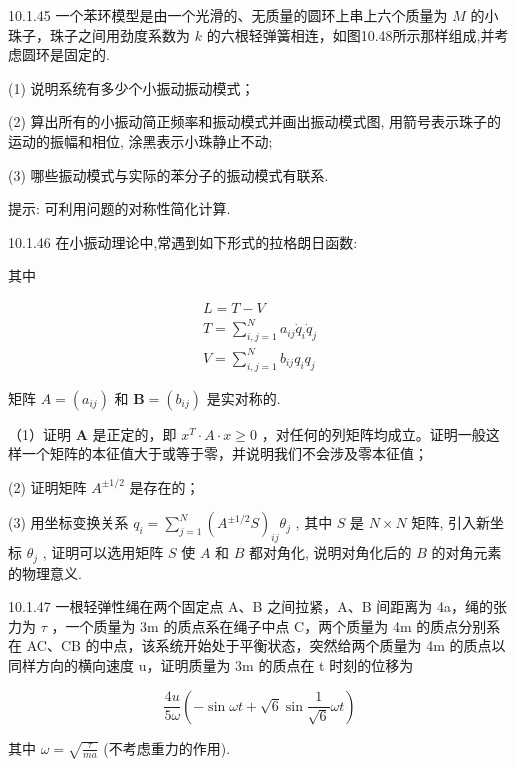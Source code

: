 \begin{problem}{10.1.45}
一个苯环模型是由一个光滑的、无质量的圆环上串上六个质量为 $M$ 的小珠子，珠子之间用劲度系数为 $k$ 的六根轻弹簧相连，如图10.48所示那样组成,并考虑圆环是固定的.

(1) 说明系统有多少个小振动振动模式；

(2) 算出所有的小振动简正频率和振动模式并画出振动模式图, 用箭号表示珠子的运动的振幅和相位, 涂黑表示小珠静止不动;

(3) 哪些振动模式与实际的苯分子的振动模式有联系.

提示: 可利用问题的对称性简化计算.
\begin{center}

\end{center}
\end{problem}
\clearpage


\begin{problem}{10.1.46}
在小振动理论中,常遇到如下形式的拉格朗日函数:

其中

\[
\begin{array}{c} L = T - V \\ T = \sum_ {i, j = 1} ^ {N} a _ {i j} \dot {q} _ {i} \dot {q} _ {j} \\ V = \sum_ {i, j = 1} ^ {N} b _ {i j} q _ {i} q _ {j} \end{array}
\]

矩阵 $A = (a_{ij})$ 和 $\bm {B} = (b_{ij})$ 是实对称的.

（1）证明 $\bm{A}$ 是正定的，即 $x^{T} \cdot A \cdot x \geqslant 0$ ，对任何的列矩阵均成立。证明一般这样一个矩阵的本征值大于或等于零，并说明我们不会涉及零本征值；

(2) 证明矩阵 $A^{\pm1/2}$ 是存在的；

(3) 用坐标变换关系 $q_{i} = \sum_{j=1}^{N} (A^{\pm 1/2} S)_{ij} \theta_{j}$ , 其中 $S$ 是 $N \times N$ 矩阵, 引入新坐标 $\theta_{j}$ , 证明可以选用矩阵 $S$ 使 $A$ 和 $B$ 都对角化, 说明对角化后的 $B$ 的对角元素的物理意义.
\end{problem}
\clearpage


\begin{problem}{10.1.47}
一根轻弹性绳在两个固定点 A、B 之间拉紧，A、B 间距离为 4a，绳的张力为 $\tau$ ，一个质量为 3m 的质点系在绳子中点 C，两个质量为 4m 的质点分别系在 AC、CB 的中点，该系统开始处于平衡状态，突然给两个质量为 4m 的质点以同样方向的横向速度 u，证明质量为 3m 的质点在 t 时刻的位移为

\[
\frac {4 u}{5 \omega} \left(- \sin \omega t + \sqrt {6} \sin \frac {1}{\sqrt {6}} \omega t\right)
\]

其中 $\omega=\sqrt{\frac{\tau}{ma}}$ (不考虑重力的作用).
\begin{center}

\end{center}
\end{problem}
\clearpage


